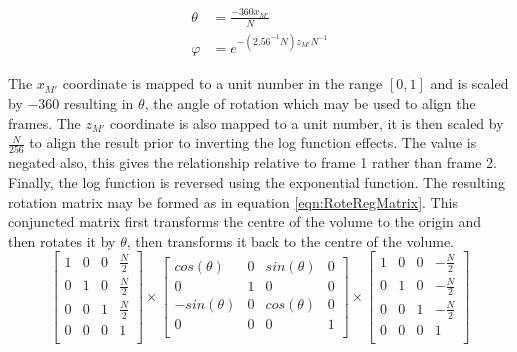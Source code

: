 \begin{equation} \label{eqn:ROTATIONSCALEFROMXM}
\begin{split}
\theta & = \frac{-360x_{M'}}{N}\\
\varphi & = e^{
-\left(
2.56^{-1}N
\right)z_{M'}N^{-1}
}
\end{split}
\end{equation}

The $x_{M'}$ coordinate is mapped to a unit number in the range $[0,1]$ and is scaled by $-360$ resulting in $\theta$, the angle of rotation which may be used to align the frames. The $z_{M'}$ coordinate is also mapped to a unit number, it is then scaled by $\frac{N}{256}$ to align the result prior to inverting the log function effects. The value is negated also, this gives the relationship relative to frame 1 rather than frame 2. Finally, the log function is reversed using the exponential function. The resulting rotation matrix may be formed as in equation \ref{eqn:RoteRegMatrix}. This conjuncted matrix first transforms the centre of the volume to the origin and then rotates it by $\theta$, then transforms it back to the centre of the volume. \\

\begin{equation} \label{eqn:RoteRegMatrix}
\left[
\begin{array}{cccc}
1 & 0 & 0 & \frac{N}{2} \\
0 & 1 & 0 & \frac{N}{2} \\
0 & 0 & 1 & \frac{N}{2} \\
0 & 0 & 0 & 1 \\
\end{array}
\right] \times
\left[
\begin{array}{cccc}
cos(\theta) & 0 & sin(\theta) & 0 \\
0 & 1 & 0 & 0 \\
-sin(\theta) & 0 & cos(\theta) & 0 \\
0 & 0 & 0 & 1 \\
\end{array}
\right] \times
\left[
\begin{array}{cccc}
1 & 0 & 0 & -\frac{N}{2} \\
0 & 1 & 0 & -\frac{N}{2} \\
0 & 0 & 1 & -\frac{N}{2} \\
0 & 0 & 0 & 1 \\
\end{array}
\right]
\end{equation}

